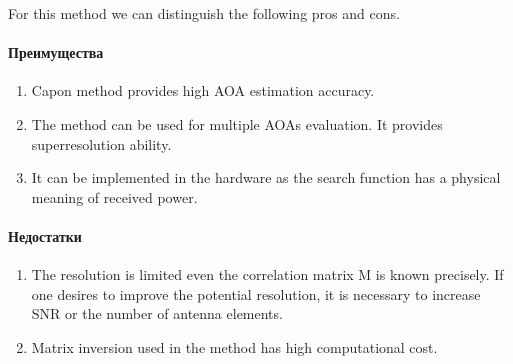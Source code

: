 For this method we can distinguish the following pros and cons.
\paragraph{Преимущества}%
\label{par:preimushchestva}
\begin{enumerate}
 \item Capon method provides high AOA estimation accuracy.
 \item The method can be used for multiple AOAs evaluation. It provides
     superresolution ability.
 \item It can be implemented in the hardware as the search function has a
     physical meaning of received power.

\end{enumerate}
\paragraph{Недостатки}%
\label{par:nedostatki}

\begin{enumerate}
 \item The resolution is limited even the correlation matrix M is known
     precisely. If one desires to improve the potential resolution, it is
     necessary to increase SNR or the number of antenna elements.
 \item Matrix inversion used in the method has high computational cost.
\end{enumerate}













